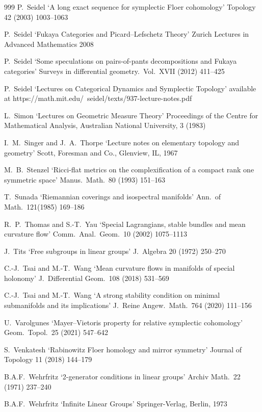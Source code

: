 \documentclass{article}
\theoremstyle{plain}%
\theoremstyle{definition}
\numberwithin{equation}{section}
\numberwithin{figure}{section}
\begin{document}
\begin{thebibliography}{999}
 P.\ Seidel
`A long exact sequence for symplectic Floer cohomology'
Topology 42 (2003) 1003--1063

 P.\ Seidel
`Fukaya Categories and Picard--Lefschetz Theory' Zurich Lectures in Advanced Mathematics 2008


    P.\ Seidel    `Some speculations on pairs-of-pants decompositions and Fukaya
   categories'
Surveys in differential geometry.\ Vol.\ XVII (2012)
   411--425
   
    P.\ Seidel    `Lectures on Categorical Dynamics
and Symplectic Topology' available at https://math.mit.edu/~seidel/texts/937-lecture-notes.pdf

  
L.\ Simon `Lectures on Geometric Measure Theory'  Proceedings of the Centre for Mathematical Analysis, Australian National University, 3 (1983)

I.\ M.\ Singer and J.\ A.\ Thorpe
`Lecture notes on elementary topology and geometry'
Scott, Foresman and Co., Glenview, IL, 1967

 M.\ B.\ Stenzel
`Ricci-flat metrics on the complexification of a compact rank one symmetric
space' Manus.\ Math.\ 80 (1993) 151--163

 T.\ Sunada
`Riemannian coverings and isospectral manifolds'
Ann.\ of Math.\ 121(1985) 169--186

 R.\ P.\ Thomas and S.-T.\ Yau
`Special Lagrangians, stable bundles and mean curvature flow'
Comm.\ Anal.\ Geom.\ 10 (2002) 1075--1113

 J.\ Tits
`Free subgroups in linear groups'
J.\ Algebra 20 (1972) 250--270

 C.-J.\ Tsai and M.-T.\ Wang
`Mean curvature flows in manifolds of special holonomy' J.\ Differential Geom.\ 108 (2018) 531--569

 C.-J.\ Tsai and M.-T.\ Wang
`A strong stability condition on minimal submanifolds and its implications'
J.\ Reine Angew.\ Math.\ 764 (2020) 111--156

 U.\ Varolgunes `Mayer--Vietoris property for relative symplectic cohomology' Geom.\ Topol.\ 25 (2021) 547--642

 S.\ Venkatesh `Rabinowitz Floer homology and mirror symmetry' Journal of Topology 11 (2018) 144--179

B.A.F.\ Wehrfritz `2-generator conditions in linear groups' Archiv Math.\ 22 (1971) 237--240

B.A.F.\ Wehrfritz `Infinite Linear Groups' Springer-Verlag, Berlin, 1973

\end{thebibliography}
\end{document}
